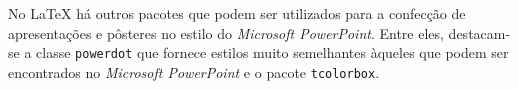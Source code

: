 





\begin{marker}
No \LaTeX{} há outros pacotes que podem ser utilizados para a confecção de apresentações e pôsteres no estilo do \textit{Microsoft PowerPoint}. Entre eles, destacam-se a classe {\tt powerdot} que fornece estilos muito semelhantes àqueles que podem ser encontrados no \textit{Microsoft PowerPoint} e o pacote {\tt tcolorbox}.
\end{marker}